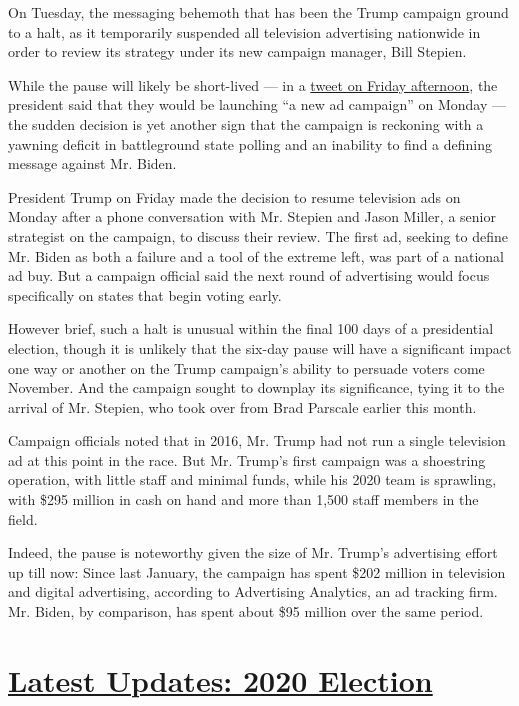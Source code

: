 On Tuesday, the messaging behemoth that has been the Trump campaign
ground to a halt, as it temporarily suspended all television advertising
nationwide in order to review its strategy under its new campaign
manager, Bill Stepien.

While the pause will likely be short-lived --- in a
\href{https://twitter.com/realDonaldTrump/status/1289275311272521728}{tweet
on Friday afternoon}, the president said that they would be launching
``a new ad campaign'' on Monday --- the sudden decision is yet another
sign that the campaign is reckoning with a yawning deficit in
battleground state polling and an inability to find a defining message
against Mr. Biden.

President Trump on Friday made the decision to resume television ads on
Monday after a phone conversation with Mr. Stepien and Jason Miller, a
senior strategist on the campaign, to discuss their review. The first
ad, seeking to define Mr. Biden as both a failure and a tool of the
extreme left, was part of a national ad buy. But a campaign official
said the next round of advertising would focus specifically on states
that begin voting early.

However brief, such a halt is unusual within the final 100 days of a
presidential election, though it is unlikely that the six-day pause will
have a significant impact one way or another on the Trump campaign's
ability to persuade voters come November. And the campaign sought to
downplay its significance, tying it to the arrival of Mr. Stepien, who
took over from Brad Parscale earlier this month.

Campaign officials noted that in 2016, Mr. Trump had not run a single
television ad at this point in the race. But Mr. Trump's first campaign
was a shoestring operation, with little staff and minimal funds, while
his 2020 team is sprawling, with \$295 million in cash on hand and more
than 1,500 staff members in the field.

Indeed, the pause is noteworthy given the size of Mr. Trump's
advertising effort up till now: Since last January, the campaign has
spent \$202 million in television and digital advertising, according to
Advertising Analytics, an ad tracking firm. Mr. Biden, by comparison,
has spent about \$95 million over the same period.

\hypertarget{latest-updates-2020-election}{%
\section{\texorpdfstring{\href{https://www.nytimes.com/2020/07/31/us/elections/biden-vs-trump.html?action=click\&pgtype=Article\&state=default\&region=MAIN_CONTENT_1\&context=storylines_live_updates}{Latest
Updates: 2020
Election}}{Latest Updates: 2020 Election}}\label{latest-updates-2020-election}}

